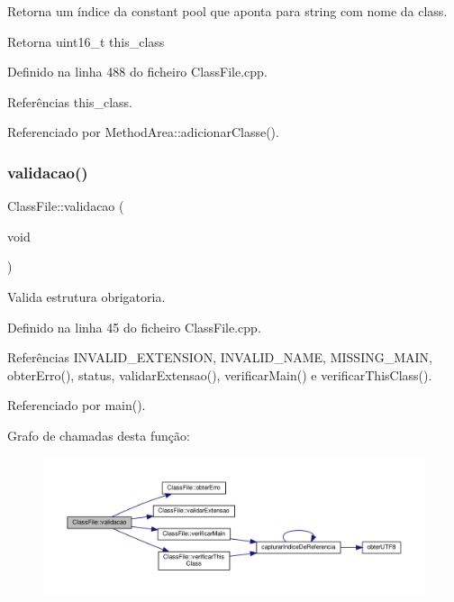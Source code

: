 Retorna um índice da constant pool que aponta para string com nome da class. 

\begin{DoxyReturn}{Retorna}
uint16\+\_\+t this\+\_\+class 
\end{DoxyReturn}


Definido na linha 488 do ficheiro Class\+File.\+cpp.



Referências this\+\_\+class.



Referenciado por Method\+Area\+::adicionar\+Classe().

\mbox{\label{classClassFile_acdb7018a6926b187bc6ecc18abf0fff8}} 
\subsubsection{\texorpdfstring{validacao()}{validacao()}}
{\footnotesize\ttfamily Class\+File\+::validacao (\begin{DoxyParamCaption}\item[{void}]{ }\end{DoxyParamCaption})}



Valida estrutura obrigatoria. 



Definido na linha 45 do ficheiro Class\+File.\+cpp.



Referências I\+N\+V\+A\+L\+I\+D\+\_\+\+E\+X\+T\+E\+N\+S\+I\+ON, I\+N\+V\+A\+L\+I\+D\+\_\+\+N\+A\+ME, M\+I\+S\+S\+I\+N\+G\+\_\+\+M\+A\+IN, obter\+Erro(), status, validar\+Extensao(), verificar\+Main() e verificar\+This\+Class().



Referenciado por main().

Grafo de chamadas desta função\+:\nopagebreak
\begin{figure}[H]
\begin{center}
\leavevmode
\includegraphics[width=350pt]{classClassFile_acdb7018a6926b187bc6ecc18abf0fff8_cgraph}
\end{center}
\end{figure}
\mbox{\label{classClassFile_a8dd042ff6873b9f0d16f8ee3812261e1}} 
